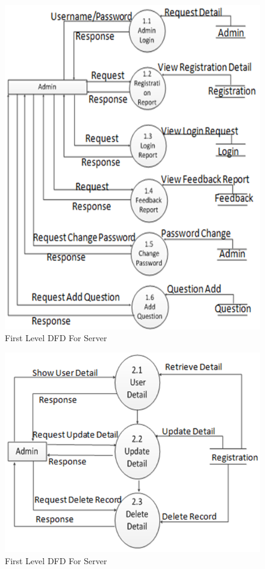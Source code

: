 \begin{figure}[h]
	\label{ss}    %
	\centering
	\includegraphics[width= 13 cm]{admin.png}
	\caption{First Level DFD For Server}
\end{figure}
\newpage
\begin{figure}[h]
	\label{ss}    %
	\centering
	\includegraphics[width= 13 cm]{admin2.png}
	\caption{First Level DFD For Server}
\end{figure}






